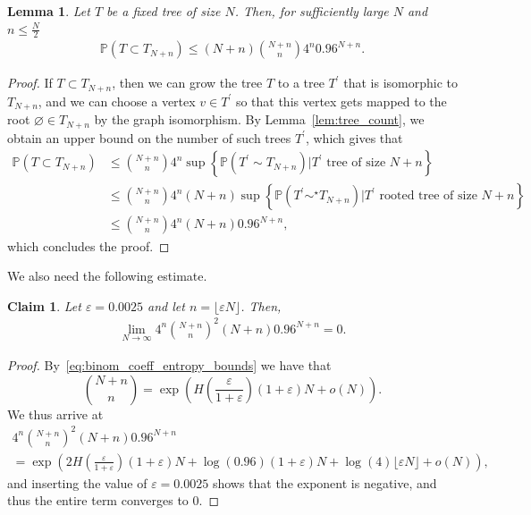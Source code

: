 \documentclass[11pt]{article}
\numberwithin{equation}{section}
\newcommand{\p}{\mathbb{P}} %
\newcommand{\eps}{\varepsilon} %
\newcommand{\be}{\begin{equation}}
\newcommand{\ee}{\end{equation}}
\newtheorem{lemma}[theorem]{Lemma}
\newtheorem{claim}[theorem]{Claim}
\theoremstyle{definition}
\begin{document}
\begin{lemma}\label{lemma:embedprob}
	Let $T$ be a {fixed} tree of size $N$. Then, for sufficiently large $N$  and $n \leq \frac{N}{2}$
	\begin{align*}
		\p \left(T \subset T_{N+n} \right) \leq  (N+n) \binom{N+n}{n} 4^n 0.96^{N+n}.
	\end{align*}
\end{lemma}

\begin{proof} 
	If $T\subset T_{N+n}$, then we can grow the tree $T$ to a tree $T^\prime$ that is isomorphic to $T_{N+n}$, and we can choose a vertex $v \in T^\prime$ so that this vertex gets mapped to the root $\varnothing \in T_{N+n}$ by the graph isomorphism. By Lemma~\ref{lem:tree_count}, we obtain an upper bound on the number of such trees $T^\prime$, which gives that
    \begin{align*}
		 \p \left(T \subset T_{N+n} \right) 
        &\leq  \binom{N+n}{n} 4^n \sup \left\{ \p \left(T^\prime \sim T_{N+n} \right)  | T^\prime \text{ tree of size $N+n$} \right\}\\
        &
        \leq   \binom{N+n}{n} 4^n (N+n) \sup \left\{ \p \left(T^\prime \sim^\star T_{N+n} \right)  | T^\prime \text{ rooted tree of size $N+n$} \right\}
        \\
        &\leq    \binom{N+n}{n} 4^n (N+n)0.96^{N+n},
    \end{align*}
    which concludes the proof.
\end{proof}

\noindent We also need the following estimate. 

\begin{claim}\label{claim:3}
	Let $\eps = 0.0025$ and let $n=\lfloor\eps N \rfloor$. Then,
	\begin{align*}
	\lim_{N\to\infty}4^n \binom{N+n}{n}^2  (N+n) 0.96^{N+n}=0.
	\end{align*} 
\end{claim}

\begin{proof}
    By~\eqref{eq:binom_coeff_entropy_bounds} we have that
    \be
    \binom{N+n}{n}=\exp\left( H \left( \frac{\eps}{1+\eps} \right)  (1+\eps)N + o(N) \right) . 
    \ee 
     We thus arrive at 
    \begin{multline*} 
    4^n \binom{N+n}{n}^2  (N+n) 0.96^{N+n} \\ 
    = \exp\left( 2 H\left( \frac{\eps}{1+\eps} \right)  (1+\eps)N + \log(0.96)(1+\eps)N +\log(4)\lfloor \eps N\rfloor+ o(N) \right),
    \end{multline*}
    and inserting the value of $\eps = 0.0025$ shows that the exponent is negative, and thus the entire term converges to $0$. 
\end{proof}
\end{document}
